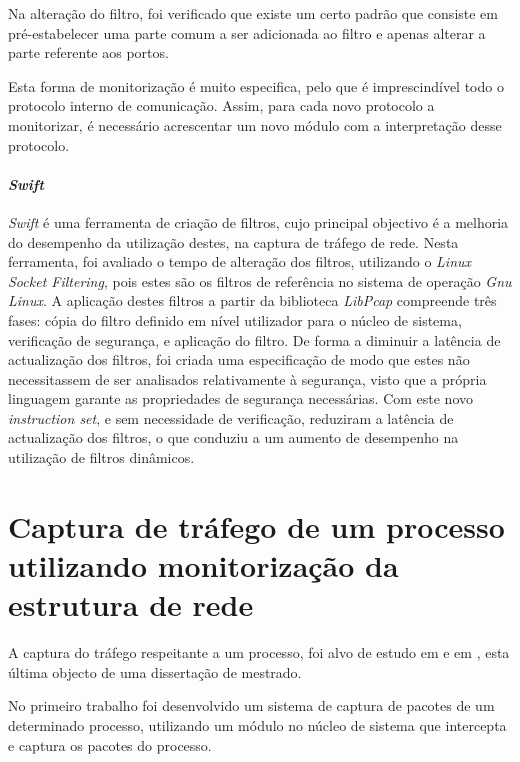 Na alteração do filtro, foi verificado que existe um certo padrão que consiste em pré-estabelecer uma parte comum a ser adicionada ao filtro e apenas alterar a parte referente aos portos.

Esta forma de monitorização é muito especifica, pelo que é imprescindível todo o protocolo interno de comunicação.
Assim, para cada novo protocolo a monitorizar, é necessário acrescentar um novo módulo com a interpretação desse protocolo.


\paragraph*{\textit{Swift}}
\textit{Swift} é uma ferramenta de criação de filtros, cujo principal objectivo é a melhoria do desempenho da utilização destes, na captura de tráfego de rede.
Nesta ferramenta, foi avaliado o tempo de alteração dos filtros, utilizando o \textit{Linux Socket Filtering}, pois estes são os filtros de referência no sistema de operação \textit{Gnu Linux}.
A aplicação destes filtros a partir da biblioteca \textit{LibPcap} compreende três fases: cópia do filtro definido em nível utilizador para o núcleo de sistema, verificação de segurança, e aplicação do filtro.
De forma a diminuir a latência de actualização dos filtros, foi criada uma especificação de modo que estes não necessitassem de ser analisados relativamente à segurança, visto que a própria linguagem garante as propriedades de segurança necessárias.
Com este novo \textit{instruction set}, e sem necessidade de verificação, reduziram a latência de actualização dos filtros, o que conduziu a um aumento de desempenho na utilização de filtros dinâmicos.

\section{Captura de tráfego de um processo utilizando monitorização da estrutura de rede}
\label{sect:outras_abordagens}

A captura do tráfego respeitante a um processo, foi alvo de estudo em \cite{1688981} e em \cite{Farruca:2009}, esta última objecto de uma dissertação de mestrado.

No primeiro trabalho foi desenvolvido um sistema de captura de pacotes de um determinado processo, utilizando um módulo no núcleo de sistema que intercepta e captura os pacotes do processo.


